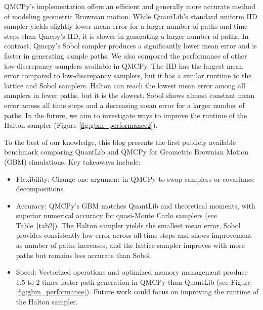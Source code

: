 QMCPy's implementation offers an efficient and generally more accurate method of modeling geometric Brownian motion. While QuantLib's standard uniform IID sampler yields slightly lower mean error for a larger number of paths and time steps than Qmcpy's IID, it is slower in generating a larger number of paths. In contrast, Qmcpy's Sobol sampler produces a significantly lower mean error and is faster in generating sample paths. We also compared the performance of other low-discrepancy samplers available in QMCPy. The IID has the largest mean error compared to low-discrepancy samplers, but it has a similar runtime to the lattice and Sobol samplers. Halton can reach the lowest mean error among all samplers in fewer paths, but it is the slowest. Sobol shows almost constant mean error across all time steps and a decreasing mean error for a larger number of paths. In the future, we aim to investigate ways to improve the runtime of the Halton sampler (Figure \ref{fig:gbm_performance2}).

\begin{tcolorbox}[title=Takeaways,colback=blue!1,colframe=blue!30!black]
To the best of our knowledge, this blog presents the first publicly available
benchmark comparing QuantLib and QMCPy for Geometric Brownian Motion (GBM)
simulations. Key takeaways include:
\begin{itemize}%
    \item Flexibility: Change one argument in QMCPy to swap samplers or
    covariance decompositions.
    \item Accuracy: QMCPy's GBM matches QuantLib and theoretical moments, with
    superior numerical accuracy for quasi-Monte Carlo samplers (see
    Table~\ref{tab2}). The Halton sampler yields the smallest mean error, Sobol provides consistently low error across all time steps and shows improvement as number of paths increases, and the lattice sampler improves with more paths but remains less accurate than Sobol.
    \item Speed: Vectorized operations and optimized memory management produce
    1.5 to 2 times faster path generation in QMCPy than QuantLib (see Figure \ref{fig:gbm_performance}). Future work could focus on improving the runtime of the Halton sampler.
\end{itemize}
\end{tcolorbox}


